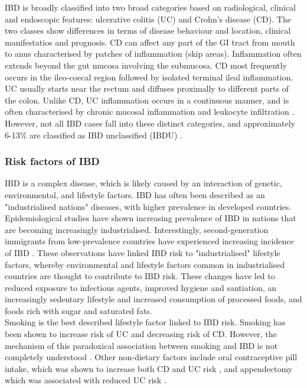 IBD is broadly classified into two broad categories based on radiological, clinical and endoscopic features: ulcerative colitis (UC) and Crohn's disease (CD). The two classes show differences in terms of disease behaviour and location, clinical manifestatios and prognosis. CD can affect any part of the GI tract from mouth to anus characterised by patches of inflammation (skip areas). Inflammation often extends beyond the gut mucosa involving the submucosa. CD most frequently occurs in the ileo-coecal region followed by isolated terminal ileal inflammation. UC usually starts near the rectum and diffuses proximally to different parts of the colon. Unlike CD, UC inflammation occurs in a continuous manner, and is often characterised by chronic mucosal inflammation and leukocyte infiltration \cite{Hendrickson2002-ky}. However, not all IBD cases fall into these distinct categories, and approximately 6-13\% are classified as IBD unclassified (IBDU) \cite{Thurgate2019-xj}.\\

\subsubsection{Risk factors of IBD}
IBD is a complex disease, which is likely caused by an interaction of genetic, environmental, and lifestyle factors. IBD has often been described as an "industrialised nations" diseases, with higher prevalence in developed countries. Epidemiological studies have shown increasing prevalence of IBD in nations that are becoming increasingly industrialised. Interestingly, second-generation immigrants from low-prevalence countries have experienced increasing incidence of IBD \cite{Bernstein2008-ln}. These observations have linked IBD risk to "industrialised" lifestyle factors, whereby environmental and lifestyle factors common in industrialised countries are thought to contribute to IBD risk. These changes have led to reduced exposure to infectious agents, improved hygiene and santiation, an increasingly sedentary lifestyle and increased consumption of processed foods, and foods rich with sugar and saturated fats.\\

Smoking is the best described lifestyle factor linked to IBD risk. Smoking has been shown to increase risk of UC and decreasing risk of CD. However, the mechanism of this paradoxical association between smoking and IBD is not completely understood \cite{Richardson2003-pd}.  Other non-dietary factors include oral contraceptive pill intake, which was shown to increase both CD and UC risk \cite{Cornish2008-rn}, and appendectomy which was associated with reduced UC risk \cite{Koutroubakis2000-qt}.\\

